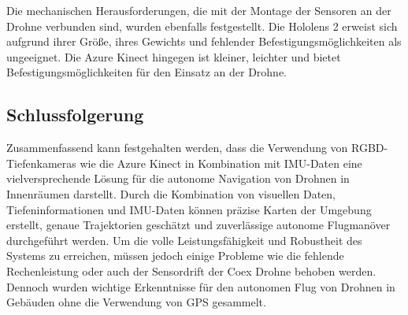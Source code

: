 Die mechanischen Herausforderungen, die mit der Montage der Sensoren an der Drohne verbunden sind, wurden ebenfalls festgestellt. Die Hololens 2 erweist sich aufgrund ihrer Größe, ihres Gewichts und fehlender Befestigungsmöglichkeiten als ungeeignet. Die Azure Kinect hingegen ist kleiner, leichter und bietet Befestigungsmöglichkeiten für den Einsatz an der Drohne.

\subsection{Schlussfolgerung}
Zusammenfassend kann festgehalten werden, dass die Verwendung von RGBD-Tiefenkameras wie die Azure Kinect in Kombination mit \ac{IMU}-Daten eine vielversprechende Lösung für die autonome Navigation von Drohnen in Innenräumen darstellt. Durch die Kombination von visuellen Daten, Tiefeninformationen und \ac{IMU}-Daten können präzise Karten der Umgebung erstellt, genaue Trajektorien geschätzt und zuverlässige autonome Flugmanöver durchgeführt werden. Um die volle Leistungsfähigkeit und Robustheit des Systems zu erreichen, müssen jedoch einige Probleme wie die fehlende Rechenleistung oder auch der Sensordrift der Coex Drohne behoben werden. \\
Dennoch wurden wichtige Erkenntnisse für den autonomen Flug von Drohnen in Gebäuden ohne die Verwendung von \ac{GPS} gesammelt.



